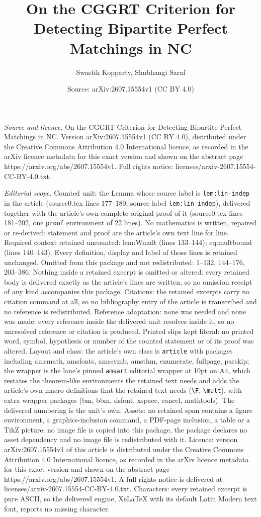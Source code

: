 \documentclass[10pt,a4paper]{amsart}
\title[On the CGGRT Criterion for Detecting Bipartite Perfect Match]{On the CGGRT Criterion for Detecting Bipartite Perfect Matchings in NC}
\author{Swastik Kopparty, Shubhangi Saraf}
\date{Source: arXiv:2607.15554v1 (CC BY 4.0)}
\begin{document}
\maketitle

\noindent\emph{Source and licence.} On the CGGRT Criterion for Detecting Bipartite Perfect Matchings in NC. Version arXiv:2607.15554v1 (CC BY 4.0), distributed under the Creative Commons Attribution 4.0 International licence, as recorded in the arXiv licence metadata for this exact version and shown on the abstract page https://arxiv.org/abs/2607.15554v1. Full rights notice: licenses/arxiv-2607.15554-CC-BY-4.0.txt.\par\smallskip

\noindent\textit{Editorial scope.} Counted unit: the Lemma whose source label is \texttt{lem:lin-indep} in the article (source0.tex lines 177--180, source label \texttt{lem:lin-indep}), delivered together with the article's own complete original proof of it (source0.tex lines 181--202, one \texttt{proof} environment of 22 lines). No mathematics is written, repaired or re-derived: statement and proof are the article's own text line for line. Required context retained uncounted: lem:Wmult (lines 133--144); eq:multbound (lines 140--143). Every definition, display and label of those lines is retained unchanged. Omitted from this package and not redistributed: 1--132, 144--176, 203--386. Nothing inside a retained excerpt is omitted or altered: every retained body is delivered exactly as the article's lines are written, so no omission receipt of any kind accompanies this package. Citations: the retained excerpts carry no citation command at all, so no bibliography entry of the article is transcribed and no reference is redistributed. Reference adaptation: none was needed and none was made; every reference inside the delivered unit resolves inside it, so no unresolved reference or citation is produced. Printed slips kept literal: no printed word, symbol, hypothesis or number of the counted statement or of its proof was altered. Layout and class: the article's own class is \texttt{article} with packages including amsmath, amsfonts, amssymb, amsthm, enumerate, fullpage, parskip; the wrapper is the lane's pinned \texttt{amsart} editorial wrapper at 10pt on A4, which restates the theorem-like environments the retained text needs and adds the article's own macro definitions that the retained text needs (\texttt{\textbackslash F}, \texttt{\textbackslash mult}), with extra wrapper packages (bm, bbm, dsfont, xspace, cancel, mathtools). The delivered numbering is the unit's own. Assets: no retained span contains a figure environment, a graphics-inclusion command, a PDF-page inclusion, a table or a TikZ picture; no image file is copied into this package, the package declares no asset dependency and no image file is redistributed with it. Licence: version arXiv:2607.15554v1 of this article is distributed under the Creative Commons Attribution 4.0 International licence, as recorded in the arXiv licence metadata for this exact version and shown on the abstract page https://arxiv.org/abs/2607.15554v1. A full rights notice is delivered at licenses/arxiv-2607.15554-CC-BY-4.0.txt. Characters: every retained excerpt is pure ASCII, so the delivered engine, XeLaTeX with its default Latin Modern text font, reports no missing character.
\end{document}
